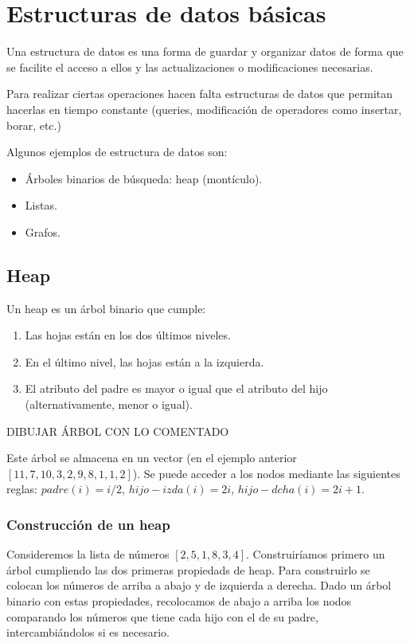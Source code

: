 \documentclass[AL.tex]{subfiles}
\begin{document}
\chapter{Estructuras de datos básicas}
Una estructura de datos es una forma de guardar y organizar datos de forma que se facilite el acceso a ellos y las actualizaciones o modificaciones necesarias.

Para realizar ciertas operaciones hacen falta estructuras de datos que permitan hacerlas en tiempo constante (queries, modificación de operadores como insertar, borar, etc.)

Algunos ejemplos de estructura de datos son:
\begin{itemize}
\item Árboles binarios de búsqueda: heap (montículo).
\item Listas.
\item Grafos. 
\end{itemize}

\section{Heap}
Un heap es un árbol binario que cumple:
\begin{enumerate}
\item Las hojas están en los dos últimos niveles.
\item En el último nivel, las hojas están a la izquierda.
\item El atributo del padre es mayor o igual que el atributo del hijo (alternativamente, menor o igual). 
\end{enumerate}

\begin{ej}
DIBUJAR ÁRBOL CON LO COMENTADO


Este árbol se almacena en un vector (en el ejemplo anterior $[11,7,10,3,2,9,8,1,1,2]$). Se puede acceder a los nodos mediante las siguientes reglas: $padre(i)=i/2$, $hijo-izda(i)=2i$, $hijo-dcha(i)=2i+1$.
\end{ej}


\subsection{Construcción de un heap}
Consideremos la lista de números $[2,5,1,8,3,4]$.  Construiríamos primero un árbol cumpliendo las dos primeras propiedads de heap. Para construirlo se colocan los números de arriba a abajo y de izquierda a derecha.  Dado un árbol binario con estas propiedades, recolocamos de abajo a arriba los nodos comparando los números que tiene cada hijo con el de su padre, intercambiándolos si es necesario. 
\end{document}
